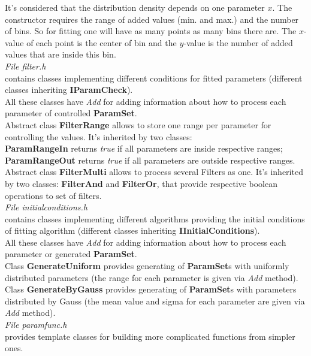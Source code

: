 \documentclass[a4paper]{article}
\begin{document}
It's considered that the distribution density depends on one parameter $x$.
The constructor requires the range of added values (min. and max.) and the number of bins.
So for fitting one will have as many points as many bins there are.
The $x$-value of each point is the center of bin and the $y$-value is the number of added values that are inside this bin.
\\
\textit{\Large File filter.h}\\
contains classes implementing different conditions for fitted parameters 
(different classes inheriting \textbf{IParamCheck}). \\
All these classes have \textit{Add} for adding information about how to process each parameter of controlled \textbf{ParamSet}.
\\
Abstract class \textbf{FilterRange} allows to store one range per parameter for controlling the values. 
It's inherited by two classes: \\
\textbf{ParamRangeIn} returns \textit{true} if all parameters are inside respective ranges; \\
\textbf{ParamRangeOut} returns \textit{true} if all parameters are outside respective ranges.
\\
Abstract class \textbf{FilterMulti} allows to process several Filters as one. It's inherited by two classes: \textbf{FilterAnd} and \textbf{FilterOr}, that provide respective boolean operations to set of filters.
\\
\textit{\Large File initialconditions.h}\\
contains classes implementing different algorithms providing the initial conditions of fitting algorithm
(different classes inheriting \textbf{IInitialConditions}). \\
All these classes have \textit{Add} for adding information about how to process each parameter or generated \textbf{ParamSet}.
\\
Class \textbf{GenerateUniform} provides generating of \textbf{ParamSet}s with uniformly distributed parameters
(the range for each parameter is given via \textit{Add} method).
\\
Class \textbf{GenerateByGauss} provides generating of \textbf{ParamSet}s with parameters distributed by Gauss 
(the mean value and sigma for each parameter are given via \textit{Add} method).
\\
\textit{\Large File paramfunc.h}\\
provides template classes for building more complicated functions from simpler ones.
\\
\end{document}
